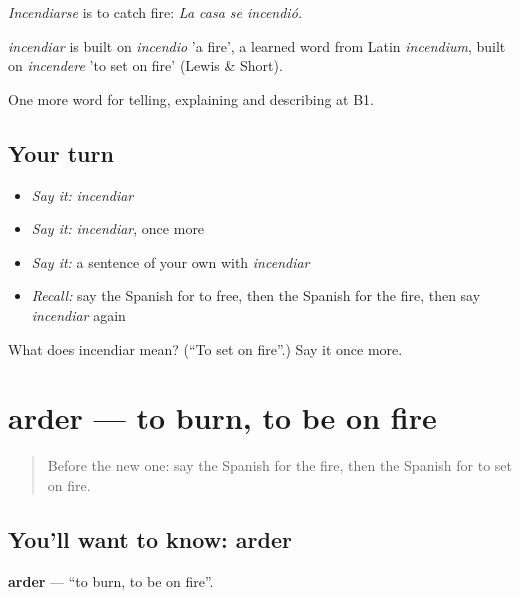 \emph{Incendiarse} is to catch fire: \emph{La casa se incendió.}

\begin{cousinweb}
\emph{incendiar} is built on \emph{incendio} 'a fire', a learned word from Latin \emph{incendium}, built on \emph{incendere} 'to set on fire' (Lewis \& Short).
\end{cousinweb}

\begin{grammarlens}[title={What you've built}]
One more word for telling, explaining and describing at B1.
\end{grammarlens}

\subsection*{Your turn}
\begin{itemize}
\raggedright
  \item \emph{Say it:} \emph{incendiar}
  \item \emph{Say it:} \emph{incendiar}, once more
  \item \emph{Say it:} a sentence of your own with \emph{incendiar}
  \item \emph{Recall:} say the Spanish for to free, then the Spanish for the fire, then say \emph{incendiar} again
\end{itemize}

\begin{tcolorbox}[breakable,colback=teal!4,colframe=teal!35!black,title={Before you move on}]
What does incendiar mean? (\textquotedblleft{}To set on fire\textquotedblright{}.) Say it once more.
\end{tcolorbox}
\section[arder]{arder — to burn, to be on fire}

\label{lesson:ES-C524-arder}



\begin{quote}
Before the new one: say the Spanish for the fire, then the Spanish for to set on fire.
\end{quote}

\subsection*{You'll want to know: arder}
\textbf{arder} — \textquotedblleft{}to burn, to be on fire\textquotedblright{}.

